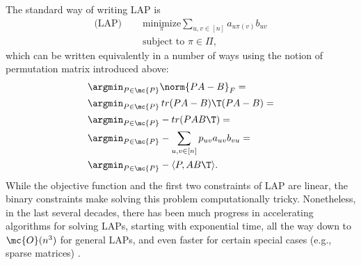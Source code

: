 \documentclass[10pt,journal,cspaper,compsoc]{IEEEtran}
\newcommand{\PmcP}{P \in \mc{P}}
\begin{document}

The standard way of writing LAP is
\begin{subequations} \label{eq:LAP}
\begin{align}
	 \text{(LAP) }\quad  &\underset{\pi}{\text{minimize}} \sum_{u,v \in [n]} a_{u \pi(v)} b_{uv} \\
	&\text{subject to } \pi \in \Pi,
\end{align}
\end{subequations}
which can be written equivalently in a number of ways using the notion of permutation matrix introduced above:
\begin{subequations} \label{eq:LAP2}
\begin{align}
	&\argmin_{\PmcP} \norm{PA - B}_F =\\
	&\argmin_{\PmcP} \, tr(PA-B)\T (PA-B)=\\ 
	&\argmin_{\PmcP}  -tr (P AB\T) =\\
	&\argmin_{\PmcP}  -\sum_{u,v \in [n]} p_{uv} a_{uv} b_{vu}
	=\\&\argmin_{\PmcP}  -\langle P, AB\T \rangle. \label{eq:dotLAP}
\end{align}
\end{subequations}
While the objective function and the first two constraints of LAP are linear, the binary constraints make solving this problem computationally tricky.  Nonetheless, in the last several decades, there has been much progress in accelerating algorithms for solving LAPs, starting with exponential time, all the way down to $\mc{O}(n^3)$ for general LAPs, and even faster for certain special cases (e.g., sparse matrices) \cite{Burkard2009}.
\end{document}
